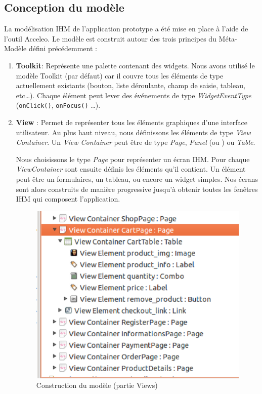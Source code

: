 \subsection{Conception du modèle}
La modélisation \textsc{IHM} de l'application prototype \kwplay{} a été mise en place à l'aide de l'outil Acceleo. Le modèle est construit autour des trois principes du Méta-Modèle défini précédemment :
\begin{enumerate}
\item \textbf{Toolkit}: Représente une palette contenant des widgets. Nous avons utilisé le modèle Toolkit (par défaut) car il couvre tous les éléments de type   actuellement existants (bouton, liste déroulante, champ de saisie, tableau, etc\dots). Chaque élément  peut lever des événements de type \textit{WidgetEventType} (\verb+onClick()+, \verb+onFocus()+ \dots). 

\item \textbf{View} : Permet de représenter tous les éléments graphiques d'une interface utilisateur. Au plus haut niveau, nous définissons les éléments de type \textit{View Container}. Un \textit{View Container} peut être de type \textit{Page}, \textit{Panel} (ou ) ou \textit{Table}. 

Nous choisissons le type \textit{Page} pour représenter un écran \textsc{IHM}. Pour chaque \textit{ViewContainer} sont ensuite définis les éléments qu'il contient. Un élément peut être un formulaires, un tableau, ou encore un widget simples. Nos écrans sont alors construits de manière progressive jusqu'à obtenir toutes les fenêtres \textsc{IHM} qui composent l'application.
\begin{figure}[H]
  \centering
  \includegraphics[scale=.4]{img/views.eps}
  \caption{Construction du modèle (partie Views)}
  \label{fig:view}
\end{figure}


\end{enumerate}
